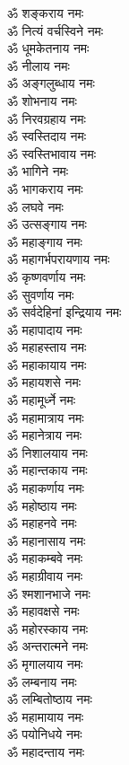 \begin{multicols}{2}
\begin{flushleft}
ॐ शङ्कराय नमः\hfill{}\\
ॐ नित्यं वर्चस्विने नमः\\
ॐ धूमकेतनाय नमः\\
ॐ नीलाय नमः\\
ॐ अङ्गलुब्धाय नमः\\
ॐ शोभनाय नमः\\
ॐ निरवग्रहाय नमः\\
ॐ स्वस्तिदाय नमः\\
ॐ स्वस्तिभावाय नमः\\
ॐ भागिने नमः\\
ॐ भागकराय नमः\hfill{}\\
ॐ लघवे नमः\\
ॐ उत्सङ्गाय नमः\\
ॐ महाङ्गाय नमः\\
ॐ महागर्भपरायणाय नमः\\
ॐ कृष्णवर्णाय नमः\\
ॐ सुवर्णाय नमः\\
ॐ सर्वदेहिनां इन्द्रियाय नमः\\
ॐ महापादाय नमः\\
ॐ महाहस्ताय नमः\\
ॐ महाकायाय नमः\hfill{}\\
ॐ महायशसे नमः\\
ॐ महामूर्ध्ने नमः\\
ॐ महामात्राय नमः\\
ॐ महानेत्राय नमः\\
ॐ निशालयाय नमः\\
ॐ महान्तकाय नमः\\
ॐ महाकर्णाय नमः\\
ॐ महोष्ठाय नमः\\
ॐ महाहनवे नमः\\
ॐ महानासाय नमः\hfill{}\\
ॐ महाकम्बवे नमः\\
ॐ महाग्रीवाय नमः\\
ॐ श्मशानभाजे नमः\\
ॐ महावक्षसे नमः\\
ॐ महोरस्काय नमः\\
ॐ अन्तरात्मने नमः\\
ॐ मृगालयाय नमः\\
ॐ लम्बनाय नमः\\
ॐ लम्बितोष्ठाय नमः\\
ॐ महामायाय नमः\hfill{}\\
ॐ पयोनिधये नमः\\
ॐ महादन्ताय नमः\\

\end{flushleft}
\end{multicols}
